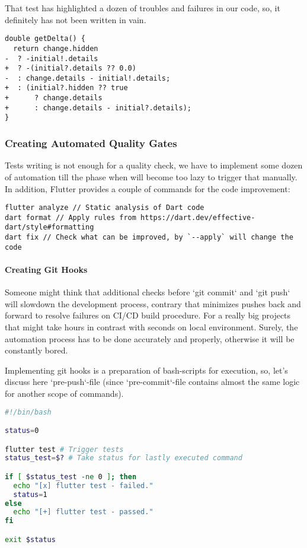 That test has highlighted a dozen of troubles and failures in our code, so, it definitely has not been written in vain.

\begin{lstlisting}
double getDelta() {
  return change.hidden
-  ? -initial!.details
+  ? -(initial?.details ?? 0.0)
-  : change.details - initial!.details;
+  : (initial?.hidden ?? true
+      ? change.details
+      : change.details - initial?.details);
}
\end{lstlisting}

\subsubsection{Creating Automated Quality Gates}

Tests writing is not enough for a quality check, we have to implement some dozen of automation till the phase 
when will become too lazy to trigger that manually. In addition, Flutter provides a couple of commands for the 
code improvement:
\begin{lstlisting}
flutter analyze // Static analysis of Dart code
dart format // Apply rules from https://dart.dev/effective-dart/style#formatting
dart fix // Check what can be improved, by `--apply` will change the code
\end{lstlisting}

\paragraph{Creating Git Hooks}

Someone might think that additional checks before `git commit` and `git push` will slowdown the development process, 
contrary that minimizes pushes back and forward to resolve failures on CI/CD build procedure. For a really big projects
that might take hours in contrast with seconds on local environment. Surely, the automation process has to be done
accurately and properly, otherwise it will be constantly bored.

Implementing git hooks is a preparation of bash-scripts for execution, so, let's discuss here `pre-push`-file (since
`pre-commit`-file contains almost the same logic for another scope of commands).

\begin{lstlisting}[language=bash]
#!/bin/bash

status=0

flutter test # Trigger tests
status_test=$? # Take status for lastly executed command

if [ $status_test -ne 0 ]; then
  echo "[x] flutter test - failed."
  status=1
else
  echo "[+] flutter test - passed."
fi

exit $status
\end{lstlisting}

